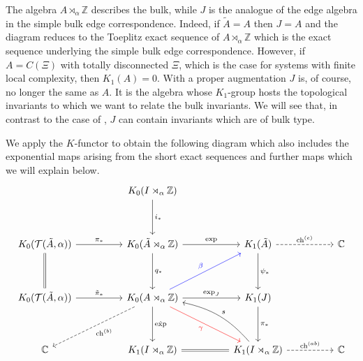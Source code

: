 \documentclass[11pt]{amsart}
\newcommand{\Z}{\mathbb{Z}}
\newcommand{\C}{\mathbb{C}}
\newcommand{\chb}{\text{ch}^{(b)}}
\newcommand{\che}{\text{ch}^{(e)}}
\newcommand{\chab}{\text{ch}^{(ab)}}
\renewcommand{\b}{\psi}
\begin{document}
The algebra $A\rtimes_\alpha \mathbb{Z}$ describes the bulk, while $J$ is the analogue of the edge algebra in the simple bulk edge correspondence. Indeed, if $\tilde A = A$ then $J=A$ and the diagram reduces to the Toeplitz exact sequence of $A\rtimes_\alpha\Z$ which is the exact sequence underlying the simple bulk edge correspondence. However, if $A=C(\Xi)$ with totally disconnected $\Xi$, which is the case for systems with finite local complexity, then $K_1(A)=0$. With a proper augmentation $J$ is, of course, no longer the same as $A$. It is the algebra whose $K_1$-group hosts the topological invariants to which we want to relate the bulk invariants.
We will see that, in contrast to the case of \cite{kellendonk_prodan}, $J$ can contain invariants which are of bulk type. 

We apply the $K$-functor to obtain the following diagram which also includes the exponential maps arising from the short exact sequences and
further maps which we will explain below.
\begin{equation}\label{eqn:focus_on_K-diagram}
	\begin{tikzcd}
		&& {K_0(I \rtimes_\alpha \mathbb{Z})}  \\
		\\
		{K_0(\mathcal{T}(\tilde{A}, \alpha))} && {K_0(\tilde{A} \rtimes_\alpha \mathbb{Z})} && {K_1(\tilde{A})} && {\mathbb{C}} \\
		\\
		{K_0(\mathcal{T}(\tilde{A}, \alpha))} && {K_0(A \rtimes_\alpha \mathbb{Z})} && {K_1(J)} \\
		\\
		\C && {K_1(I \rtimes_\alpha \mathbb{Z})} && {K_1(I \rtimes_\alpha \mathbb{Z})}  && {\mathbb{C}} 
		\arrow["{i_*}", from=1-3, to=3-3]
		\arrow["{\mathrm{exp}}", from=3-3, to=3-5]
		\arrow["{q_*}", from=3-3, to=5-3]
		\arrow[dashed, "{\che}", from=3-5, to=3-7]
		\arrow["{\b_*}", from=3-5, to=5-5]
		\arrow["{\mathrm{exp}_J}", from=5-3, to=5-5]
		\arrow[color={rgb,10:red,0;green,0;blue,10}, "{\beta}", from=5-3, to=3-5]
		\arrow[color={rgb,10:red,10;green,0;blue,0},"{\gamma}"', from=5-3, to=7-5]
		\arrow["{\hat{\mathrm{exp}}}", from=5-3, to=7-3]
		\arrow["{\pi_*}", from=5-5, to=7-5]
		\arrow["s"', bend right=18, from=7-5, to=5-3]
		\arrow[equal,  from=7-3, to=7-5]
		\arrow[dashed, "{\chab}", from=7-5, to=7-7]
		\arrow[dashed, "{\chb}", from=5-3, to=7-1]
		\arrow["{\tilde{\pi}_*}", from=5-1, to=5-3]
		\arrow[equal, from=3-1, to=5-1] 
		\arrow["{\pi_*}", from=3-1, to=3-3]
	\end{tikzcd}
\end{equation}
\end{document}
